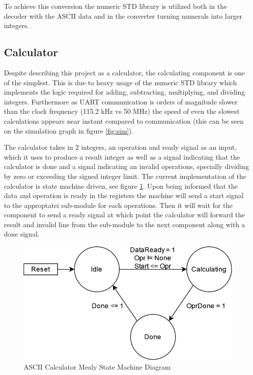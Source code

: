 \documentclass[11pt]{article}
\begin{document}
To achieve this conversion the numeric STD library is utilized both in the decoder with the ASCII data and in the converter turning numerals into larger integers.
\subsection{Calculator}

Despite describing this project as a calculator, the calculating component is one of the simplest.
This is due to heavy usage of the numeric STD library which implements the logic required for adding, subtracting, multiplying, and dividing integers.
Furthermore as UART communication is orders of magnitude slower than the clock frequency (115.2 kHz vs 50 MHz)
the speed of even the slowest calculations appears near instant compared to communication (this can be seen on the simulation graph in figure \ref{fig:sim}).

The calculator takes in 2 integers, an operation and ready signal as an input, which it uses to produce a result integer as well as a signal indicating that the calculator is done and a signal indicating an invalid operations, specially dividing by zero or exceeding the signed integer limit.
The current implementation of the calculator is state machine driven, see figure \ref{fig:calcsm}. 
Upon being informed that the data and operation is ready in the registers the machine will send a start signal to the approptatei sub-module for each operations.
Then it will wait for the component to send a ready signal at which point the calculator will forward the result and invalid line from the sub-module to the next component along with a done signal.

\begin{figure}[H]        
    \centering
    \includegraphics[width=.66\textwidth]{CalculatorSM.drawio.png}
    \caption{ASCII Calculator Mealy State Machine Diagram}
    \label{fig:calcsm}
\end{figure} 
\end{document}
